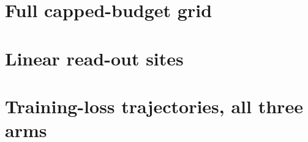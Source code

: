 \documentclass{article}
\begin{document}



\appendix
\section{Full capped-budget grid}
\label{app:capped}

\begin{table}[H]
\centering
\small
\tablecapped
\caption{Mean episode-restricted recall accuracy (three seeds) by arm, KV
budget, and evaluation context length on the primary cell. The matrix
fast-weight model's state is 32{,}768 bytes at every entry of its row; the
transformer's cap at budget $M$ pins its total KV bytes across layers and
heads to $M \times 32{,}768$. $M{=}1$ is excluded from the registered walk
because its cap length (8 tokens) sits below the query length; its
descriptive readings, 0.021 to 0.030 across seeds and horizons, sit at
chance like every other transformer entry. Chance is 0.031; the
demonstration bar is 0.094; no transformer entry approaches
either.} %
\label{tab:capped}
\end{table}

\section{Linear read-out sites}
\label{app:taps}

\begin{table}[H]
\centering
\small
\tabletaps
\caption{Offline ridge-probe recovery of the bound value's target vector
by read-out site, on the single-seed localization checkpoints (fit on
24{,}576 fresh draws, evaluated on the pinned 4{,}096-query set;
``rf@0.9'' is the fraction of queries whose predicted vector clears cosine
0.9 against the target; ``gap'' is cosine mean minus a shuffled-fit
control). No linear combine of a raw recurrent state and the query clears
the threshold in either arm, including the read placed directly on the
causally necessary $S_0$; only the pre-LM-head hidden state decodes, and
only in the matrix fast-weight arm.} %
\label{tab:taps}
\end{table}

\section{Training-loss trajectories, all three arms}
\label{app:traincurve}
\end{document}
